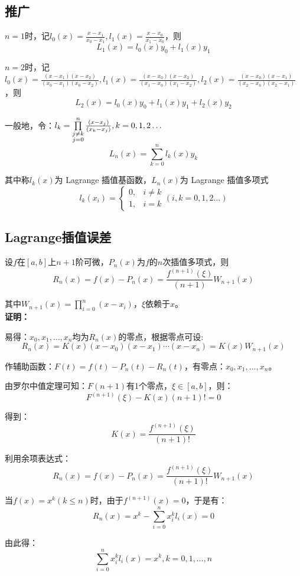 \documentclass[UTF8,a4paper,11pt,oneside]{ctexbook}
\begin{document}
\subsection{推广}

\(n=1\)时，记\(l_0(x)=\frac{x-x_1}{x_0-x_1},l_1(x)=\frac{x-x_0}{x_1-x_0}\)，则
\[
L_1(x)=l_0(x)y_0+l_1(x)y_1
\]

\(n=2\)时，记\(l_0(x)=\frac{(x-x_1)(x-x_2)}{(x_0-x_1)(x_0-x_2)},l_1(x)=\frac{(x-x_0)(x-x_2)}{(x_1-x_0)(x_1-x_2)},l_2(x)=\frac{(x-x_0)(x-x_1)}{(x_2-x_0)(x_2-x_1)}\)，则
\[
L_2(x)=l_0(x)y_0+l_1(x)y_1+l_2(x)y_2
\]

一般地，令：\(l_k=\prod\limits_{\begin{subarray}{c}
    j\neq k\\
    j=0
\end{subarray}}^n\frac{(x-x_j)}{(x_k-x_j)},k=0,1,2\ldots\)
\[
L_n(x)=\sum_{k=0}^nl_k(x)y_k
\]

其中称\(l_k(x)\)为 Lagrange 插值基函数，\(L_n(x)\)为 Lagrange 插值多项式
\[
l_k(x_i)=\begin{cases}
    0,&i\neq k\\
    1,&i=k
\end{cases}(i,k=0,1,2\ldots)
\]
\subsection{Lagrange插值误差}

设\(f\)在\([a,b]\)上\(n+1\)阶可微，\(P_n(x)\)为\(f\)的\(n\)次插值多项式，则
\[
R_n(x)=f(x)-P_n(x)=\frac{f^{(n+1)}(\xi)}{(n+1)}W_{n+1}(x)
\]

其中\(W_{n+1}(x)=\prod\limits_{i=0}^n(x-x_i)\)，\(\xi\)依赖于\(x\)。\\
\textbf{证明：}

易得：\(x_0,x_1,\ldots,x_n\)均为\(R_n(x)\)的零点，根据零点可设:
\[
R_n(x)=K(x)(x-x_0)(x-x_1)\cdots(x-x_n)=K(x)W_{n+1}(x)
\]

作辅助函数：\(F(t)=f(t)-P_n(t)-R_n(t)\)，有零点：\(x_0,x_1,\ldots,x_n\)。

由罗尔中值定理可知：\(F(n+1)\)有1个零点，\(\xi \in[a,b]\)，则：
\[
F^{(n+1)}(\xi)-K(x)(n+1)!=0
\]

得到：
\[
K(x)=\frac{f^{(n+1)}(\xi)}{(n+1)!}
\]

利用余项表达式：
\[
R_n(x)=f(x)-P_n(x)=\frac{f^{(n+1)}(\xi)}{(n+1)!}W_{n+1}(x)
\]

当\(f(x)=x^k(k\leq n)\)时，由于\(f^{(n+1)}(x)=0\)，于是有：
\[
R_n(x)=x^k-\sum_{i=0}^nx_i^kl_i(x)=0
\]

由此得：
\[
\sum_{i=0}^nx_i^kl_i(x)=x^k,k=0,1,\ldots,n
\]
\end{document}
